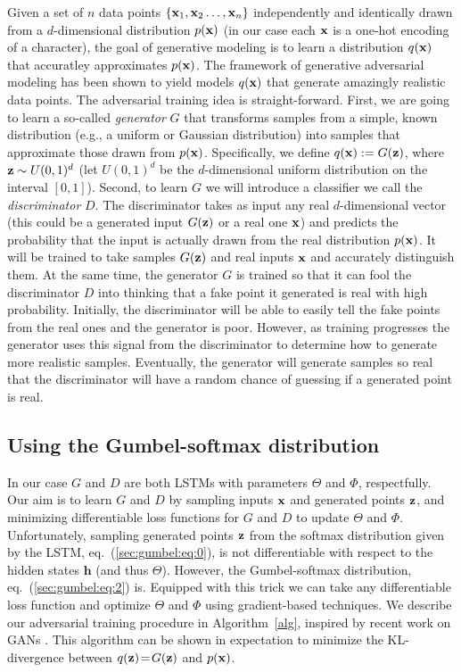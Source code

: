 Given a set of $n$ data points $\{ \mathbf{x}_1, \mathbf{x}_2 \ldots, \mathbf{x}_n\}$ independently and identically drawn from a $d$-dimensional distribution $p(\mathbf{x})$ (in our case each $\mathbf{x}$ is a one-hot encoding of a character), the goal of generative modeling is to learn a distribution $q(\mathbf{x})$ that accuratley approximates $p(\mathbf{x})$. The framework of generative adversarial modeling has been shown to yield models $q(\mathbf{x})$ that generate amazingly realistic data points. The adversarial training idea is straight-forward. First, we are going to learn a so-called \emph{generator} $G$ that transforms samples from a simple, known distribution (e.g., a uniform or Gaussian distribution) into samples that approximate those drawn from $p(\mathbf{x})$. Specifically, we define $q(\mathbf{x}) := G(\mathbf{z})$, where $\mathbf{z} \sim U(0,1)^d$ (let $U(0,1)^d$ be the $d$-dimensional uniform distribution on the interval $[0,1]$). Second, to learn $G$ we will introduce a classifier we call the \emph{discriminator} $D$. The discriminator takes as input any real $d$-dimensional vector (this could be a generated input $G(\mathbf{z})$ or a real one $\mathbf{x}$) and predicts the probability that the input is actually drawn from the real distribution $p(\mathbf{x})$. It will be trained to take samples $G(\mathbf{z})$ and real inputs $\mathbf{x}$ and accurately distinguish them. At the same time, the generator $G$ is trained so that it can fool the discriminator $D$ into thinking that a fake point it generated is real with high probability. Initially, the discriminator will be able to easily tell the fake points from the real ones and the generator is poor. However, as training progresses the generator uses this signal from the discriminator to determine how to generate more realistic samples. Eventually, the generator will generate samples so real that the discriminator will have a random chance of guessing if a generated point is real.

\subsection*{Using the Gumbel-softmax distribution}
In our case $G$ and $D$ are both LSTMs with parameters $\Theta$ and $\Phi$, respectfully. Our aim is to learn $G$ and $D$ by sampling inputs $\mathbf{x}$ and generated points $\mathbf{z}$, and minimizing differentiable loss functions for $G$ and $D$ to update $\Theta$ and $\Phi$. Unfortunately, sampling generated points $\mathbf{z}$ from the softmax distribution given by the LSTM, eq.~(\ref{sec:gumbel:eq:0}), is not differentiable with respect to the hidden states $\mathbf{h}$ (and thus $\Theta$). However, the Gumbel-softmax distribution, eq.~(\ref{sec:gumbel:eq:2}) is. Equipped with this trick we can take any differentiable loss function and optimize $\Theta$ and $\Phi$ using gradient-based techniques. We describe our adversarial training procedure in Algorithm~\ref{alg}, inspired by recent work on GANs \cite{sonderby2016amortised}. This algorithm can be shown in expectation to minimize the KL-divergence between $q(\mathbf{z}) \!=\! G(\mathbf{z})$ and $p(\mathbf{x})$.


